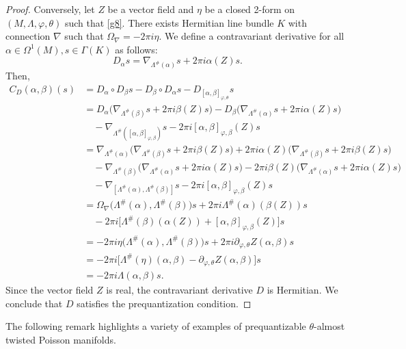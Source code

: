 \documentclass[a4paper,10pt]{article}
\numberwithin{equation}{section}
\theoremstyle{plain}
\newcommand{\CD}{C_D}
\begin{document}
\begin{proof}
		
		Conversely,  let $Z$ be  a vector field and  \(\eta\) be  a closed  2-form  on $(M,\Lambda,\varphi,\theta)$ such that \eqref{g8}.  There exists Hermitian line bundle \(K\) with connection \(\nabla\) such that \(\Omega_\nabla = -2\pi i \eta\). We  define a contravariant derivative  for all $\alpha \in \Omega^1(M),s\in \Gamma(K)$ as follows:
		$$
		D_\alpha s = \nabla_{\Lambda^{\#}(\alpha)} s + 2\pi i \alpha(Z)s.
		$$
		Then,
		\[
		\begin{aligned}
		\CD(\alpha,\beta)(s) &=D_\alpha\circ D_\beta s-D_\beta\circ D_\alpha s-D_{{[\alpha,\beta]_{\varphi,\theta}}}s\\
		&=D_\alpha\Big(\nabla_{\Lambda^{\#}(\beta)} s + 2\pi i \beta(Z)s\Big)-D_\beta\Big( \nabla_{\Lambda^{\#}(\alpha)} s + 2\pi i \alpha(Z)s\Big)\\
		&\quad- \nabla_{\Lambda^{\#}([\alpha,\beta]_{\varphi,\beta})} s - 2\pi i[\alpha,\beta]_{\varphi,\beta}(Z)s\\
		&= \nabla_{\Lambda^{\#}(\alpha)}\Big( \nabla_{\Lambda^{\#}(\beta)} s + 2\pi i \beta(Z)s \Big)  + 2\pi i \alpha(Z)\Big(\nabla_{\Lambda^{\#}(\beta)} s + 2\pi i \beta(Z)s  \Big)\\
		&\quad- \nabla_{\Lambda^{\#}(\beta)}\Big( \nabla_{\Lambda^{\#}(\alpha)} s + 2\pi i \alpha(Z)s \Big)  - 2\pi i \beta(Z)\Big(\nabla_{\Lambda^{\#}(\alpha)} s + 2\pi i \alpha(Z)s  \Big)\\
		&\quad- \nabla_{[\Lambda^{\#}(\alpha),\Lambda^{\#}(\beta)]} s - 2\pi i[\alpha,\beta]_{\varphi,\beta}(Z)s\\
		&= \Omega_\nabla\big(\Lambda^{\#}(\alpha), \Lambda^{\#}(\beta)\big)s + 2\pi i  \Lambda^{\#}(\alpha)(\beta(Z))s\\
		&\quad - 2\pi i \Big[\Lambda^{\#}(\beta)(\alpha(Z))+[\alpha,\beta]_{\varphi,\beta}(Z)\Big]s\\
		&= -2\pi i \eta\big(\Lambda^{\#}(\alpha), \Lambda^{\#}(\beta)\big)s + 2\pi i \partial_{\varphi,\theta} Z(\alpha,\beta)s \\
		&= -2\pi i \Big[ \Lambda^{\#}(\eta)(\alpha,\beta) - \partial_{\varphi,\theta} Z(\alpha,\beta) \Big]s \\
		&= -2\pi i \Lambda(\alpha,\beta)s.
		\end{aligned}
		\]
Since the vector field $Z$ is real, the contravariant derivative $D$ is Hermitian. We conclude that $D$ satisfies the prequantization condition.
\end{proof}

The following remark highlights a variety of examples of prequantizable $\theta$-almost twisted Poisson manifolds.
\end{document}
